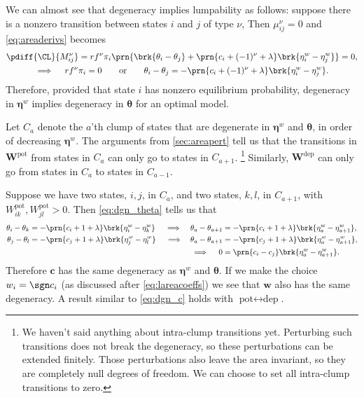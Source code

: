 \documentclass[12pt]{article}
\newcommand{\eqm}{\pi}
\newcommand{\etwm}{\eta^w}
\newcommand{\etw}{\boldsymbol{\eta}^w}
\newcommand{\thbm}{\theta}
\newcommand{\thb}{\boldsymbol{\thbm}}
\newcommand{\wm}{w}
\newcommand{\w}{\mathbf{\wm}}
\newcommand{\Wm}{W}
\newcommand{\W}{\mathbf{\Wm}}
\newcommand{\MMdm}{M}
\newcommand{\kktm}{\mu}
\newcommand{\pot}{^{\text{pot}}}
\newcommand{\dep}{^{\text{dep}}}
\begin{document}
We can almost see that degeneracy implies lumpability as follows:
suppose there is a nonzero transition between states \(i\) and \(j\) of type \(\nu\),
Then \(\kktm^\nu_{ij} = 0\) and \cref{eq:areaderivs} becomes
%
\begin{equation}\label{eq:dgn_theta}
\begin{gathered}
  \pdiff{\CL}{\MMdm^\nu_{ij}} =
    r f^\nu \eqm_i \prn{ \brk{\thbm_i - \thbm_j}
     + \prn{c_i + (-1)^\nu + \lambda} \brk{\etwm_i - \etwm_j} } 
    = 0, \\
    \implies \quad
    r f^\nu \eqm_i = 0
    \qquad \text{or} \qquad
    \thbm_i - \thbm_j = -  \prn{c_i + (-1)^\nu + \lambda} \brk{\etwm_i - \etwm_j}. 
\end{gathered}
\end{equation}
%
Therefore, provided that state \(i\) has nonzero equilibrium probability, degeneracy in \(\etw\) implies degeneracy in \(\thb\) for an optimal model.

Let \(C_a\) denote the \(a\)'th clump of states that are degenerate in \(\etw\) and \(\thb\), in order of decreasing \(\etw\).
The arguments from \cref{sec:areapert} tell us that the transitions in \(\W\pot\) from states in \(C_a\) can only go to states in \(C_{a+1}\).%
\footnote{We haven't said anything about intra-clump transitions yet.
Perturbing such transitions does not break the degeneracy, so these perturbations can be extended finitely.
Those perturbations also leave the area invariant, so they are completely null degrees of freedom.
We can choose to set all intra-clump transitions to zero.}
Similarly, \(\W\dep\) can only go from states in \(C_a\) to states in \(C_{a-1}\).

Suppose we have two states, \(i,j\), in \(C_a\), and two states, \(k,l\), in \(C_{a+1}\), with \(\Wm\pot_{ik}, \Wm\pot_{jl} > 0\).
Then \cref{eq:dgn_theta} tells us that
%
\begin{equation}\label{eq:dgn_c}
\begin{aligned}
  \thbm_i - \thbm_k &= - \prn{c_i + 1 + \lambda} \brk{\etwm_i - \etwm_k} 
  \quad \implies & 
  \thbm_a - \thbm_{a+1} &= - \prn{c_i + 1 + \lambda} \brk{\etwm_a - \etwm_{a+1}}, \\
  \thbm_j - \thbm_l &= - \prn{c_j + 1 + \lambda} \brk{\etwm_j - \etwm_l}
  \quad \implies & 
  \thbm_a - \thbm_{a+1} &= - \prn{c_j + 1 + \lambda} \brk{\etwm_a - \etwm_{a+1}}, \\
  && \implies \quad 
  0 &= \prn{c_i - c_j} \brk{\etwm_a - \etwm_{a+1}}. \\
\end{aligned}
\end{equation}
%
Therefore \(\mathbf{c}\) has the same degeneracy as \(\etw\) and \(\thb\).
If we make the choice \(\wm_i = \sgn c_i\) (as discussed after \cref{eq:lareacoeffs}) we see that \(\w\) also has the same degeneracy.
A result similar to \cref{eq:dgn_c} holds with \( \text{pot} \leftrightarrow \text{dep} \).
\end{document}
